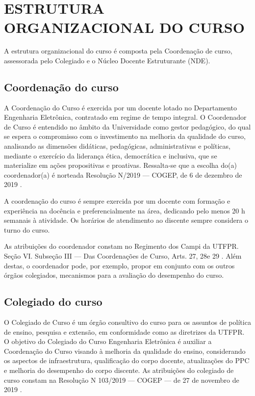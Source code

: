 \chapter{ESTRUTURA ORGANIZACIONAL DO CURSO}

A estrutura organizacional do curso é composta pela Coordenação de curso, assessorada pelo Colegiado e o Núcleo Docente Estruturante (NDE).

\section{Coordenação do curso}

A Coordenação do Curso é exercida por um docente lotado no Departamento Engenharia Eletrônica, contratado em regime de tempo integral. O Coordenador de Curso é entendido no âmbito da Universidade como gestor pedagógico, do qual se espera o compromisso com o investimento na melhoria da qualidade do curso, analisando as dimensões didáticas, pedagógicas, administrativas e políticas, mediante o exercício da liderança ética, democrática e inclusiva, que se materialize em ações propositivas e proativas. Ressalta-se que a escolha do(a) coordenador(a) é norteada Resolução N/2019 — COGEP, de 6 de dezembro de 2019 \cite{cogep145}.

A coordenação do curso é sempre exercida por um docente com formação e experiência na docência e preferencialmente na área, dedicando pelo menos 20 h semanais à atividade. Os horários de atendimento ao discente sempre considera o turno do curso.

As atribuições do coordenador constam no Regimento dos Campi da UTFPR. Seção VI. Subseção III — Das Coordenações de Curso, Arts. 27\textordmasculine, 28\textordmasculine e 29\textordmasculine{} \cite{regimento}. Além destas, o coordenador pode, por exemplo, propor em conjunto com os outros órgãos colegiados, mecanismos para a avaliação do desempenho do curso.

\section{Colegiado do curso}

O Colegiado de Curso é um órgão consultivo do curso para os assuntos de política de ensino, pesquisa e extensão, em conformidade como as diretrizes da UTFPR. O objetivo do Colegiado do Curso Engenharia Eletrônica é auxiliar a Coordenação do Curso visando à melhoria da qualidade do ensino, considerando os aspectos de infraestrutura, qualificação do corpo docente, atualizações do PPC e melhoria do desempenho do corpo discente. As atribuições do colegiado de curso constam na Resolução N\textordmasculine{} 103/2019 — COGEP — de 27 de novembro de 2019 \cite{cogep103}.